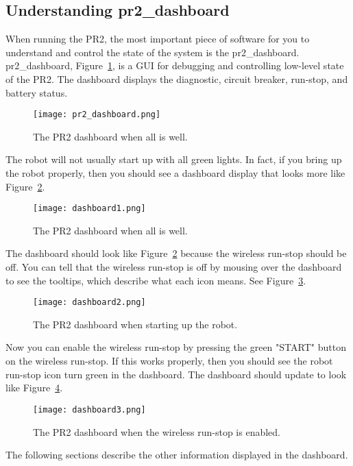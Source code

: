 \subsection{Understanding pr2\_dashboard}
When running the PR2, the most important piece of software for you to understand and control the state of the system is 
the pr2\_dashboard. pr2\_dashboard, Figure~\ref{fig:dashboard}, is a GUI for debugging and controlling low-level state 
of the PR2. The dashboard displays the diagnostic, circuit breaker, run-stop, and battery status.
\begin{figure}[h]
\centering
\texttt{[image: pr2\_dashboard.png]}
\caption{The PR2 dashboard when all is well.}
\label{fig:dashboard}
\end{figure}
The robot will not usually start up with all green lights. In fact, if you bring up the robot properly, then you should see a dashboard display that looks more like Figure~\ref{fig:dashboard1}.
\begin{figure}[h]
\centering
\texttt{[image: dashboard1.png]}
\caption{The PR2 dashboard when all is well.}
\label{fig:dashboard1}
\end{figure}
The dashboard should look like Figure~\ref{fig:dashboard1} because the wireless run-stop should be off. You can tell that the wireless run-stop is off by mousing over the dashboard to see the tooltips, which describe what each icon means. See Figure~\ref{fig:dashboard2}.

\begin{figure}[h]
\centering
\texttt{[image: dashboard2.png]}
\caption{The PR2 dashboard when starting up the robot.}
\label{fig:dashboard2}
\end{figure}

Now you can enable the wireless run-stop by pressing the green "START" button on the wireless run-stop. If this works properly, then you should see the robot run-stop icon turn green in the dashboard. The dashboard should update to look like Figure~\ref{fig:dashboard3}.

\begin{figure}[h]
\centering
\texttt{[image: dashboard3.png]}
\caption{The PR2 dashboard when the wireless run-stop is enabled.}
\label{fig:dashboard3}
\end{figure}

The following sections describe the other information displayed in the dashboard.

